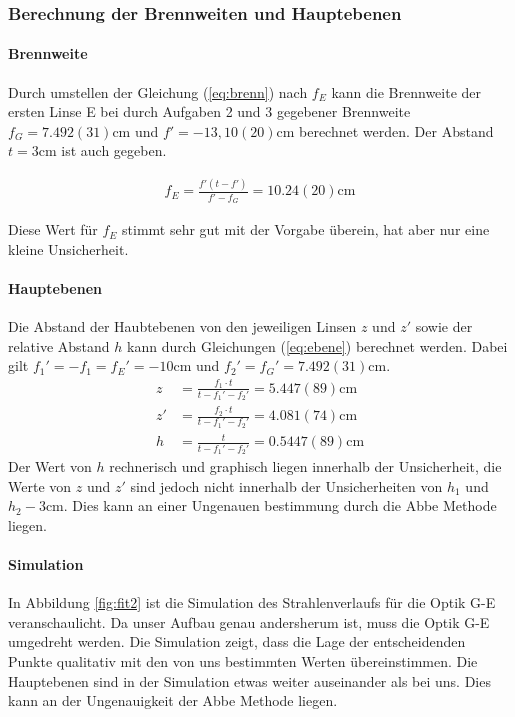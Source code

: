 \documentclass[11pt, a4paper]{article}
\begin{document}
    \subsubsection{Berechnung der Brennweiten und Hauptebenen}
    \paragraph{Brennweite}
    Durch umstellen der Gleichung (\ref{eq:brenn}) nach $f_E$ kann die Brennweite der ersten Linse E bei durch Aufgaben 2 und 3 gegebener Brennweite $f_G = 7.492(31) \si{\centi\metre}$ und $f' = - 13,10(20) \si{\centi\metre}$ berechnet werden. Der Abstand $t = 3 \si{\centi\metre}$ ist auch gegeben.

    \begin{align}
        f_E = \frac{f' \left(t - f'\right)}{f' - f_G} = 10.24(20) \si{\centi\metre}
    \end{align}

    Diese Wert für $f_E$ stimmt sehr gut mit der Vorgabe überein, hat aber nur eine kleine Unsicherheit.

    \paragraph{Hauptebenen}
    Die Abstand der Haubtebenen von den jeweiligen Linsen $z$ und $z'$ sowie der relative Abstand $h$ kann durch Gleichungen (\ref{eq:ebene}) berechnet werden. Dabei gilt $f_1' = -f_1 = f_E' = -10 \si{\centi\metre}$ und $f_2' = f_G' = 7.492(31) \si{\centi\metre}$.
    \begin{align}
        z &= \frac{f_1 \cdot t}{t - f_1' - f_2'} = 5.447(89) \si{\centi\metre} \\
        z' &= \frac{f_2 \cdot t}{t - f_1' - f_2'} = 4.081(74) \si{\centi\metre} \\
        h &= \frac{t}{t - f_1' - f_2'} = 0.5447(89) \si{\centi\metre}
    \end{align}
    Der Wert von $h$ rechnerisch und graphisch liegen innerhalb der Unsicherheit, die Werte von $z$ und $z'$ sind jedoch nicht innerhalb der Unsicherheiten von $h_1$ und $h_2 - 3 \si{\centi\metre}$. Dies kann an einer Ungenauen bestimmung durch die Abbe Methode liegen.

    \paragraph{Simulation}
    In Abbildung \ref{fig:fit2} ist die Simulation des Strahlenverlaufs für die Optik G-E veranschaulicht. Da unser Aufbau genau andersherum ist, muss die Optik G-E umgedreht werden. Die Simulation zeigt, dass die Lage der entscheidenden Punkte qualitativ mit den von uns bestimmten Werten übereinstimmen. Die Hauptebenen sind in der Simulation etwas weiter auseinander als bei uns. Dies kann an der Ungenauigkeit der Abbe Methode liegen.
\end{document}
